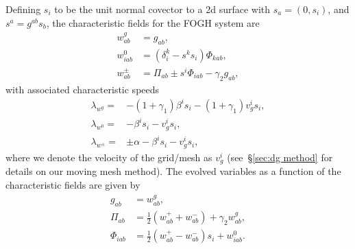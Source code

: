 \documentclass[12pt]{caltech_thesis}
\begin{document}
\begin{bibunit}[unsrtnat]
Defining $s_i$ to be the unit normal covector to a 2d surface with
$s_a=(0,s_i)$, and $s^a=g^{ab}s_b$, the characteristic fields for the FOGH
system are~\cite{Lindblom:2005qh}
\begin{eqnarray}
  \label{eq:fosh gh w g}
  w^{g}_{ab} &= g_{ab}, \\
  \label{eq:fosh gh w 0}
  w^{0}_{iab} &= (\delta^k_i-s^k s_i)\Phi_{kab}, \\
  \label{eq:fosh gh w pm}
  w^{\pm}_{ab} &= \Pi_{ab}\pm s^i\Phi_{iab} -\gamma_2 g_{ab},
\end{eqnarray}
with associated characteristic speeds
\begin{eqnarray}
  \label{eq:fosh gh char speed g}
  \lambda_{w^g} =& -(1+\gamma_1)\beta^i s_i -(1+\gamma_1)v^i_g s_i, \\
  \label{eq:fosh gh char speed 0}
  \lambda_{w^0} =& -\beta^i s_i -v^i_g s_i, \\
  \label{eq:fosh gh char speed pm}
  \lambda_{w^\pm} =& \pm \alpha - \beta^i s_i - v^i_g s_i,
\end{eqnarray}
where we denote the velocity of the grid/mesh as $v^i_g$ (see~\S\ref{sec:dg
  method} for details on our moving mesh method). The evolved variables as a
function of the characteristic fields are given by
\begin{eqnarray}
  \label{eq:fosh gh metric from char}
  g_{ab} &= w^g_{ab}, \\
  \label{eq:fosh gh pi from char}
  \Pi_{ab} &= \frac{1}{2}\left(w^+_{ab} + w^-_{ab}\right)+\gamma_2 w^g_{ab}, \\
  \label{eq:fosh gh phi from char}
  \Phi_{iab} &= \frac{1}{2}\left(w^+_{ab} - w^-_{ab}\right)s_i + w^0_{iab}.
\end{eqnarray}


\end{bibunit}
\end{document}
